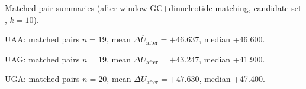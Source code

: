 Matched-pair summaries (after-window GC+dinucleotide matching, candidate set , $k=10$).

UAA: matched pairs $n=19$, mean $\Delta\overline{U}_{\mathrm{after}}=+46.637$, median +46.600.

UAG: matched pairs $n=19$, mean $\Delta\overline{U}_{\mathrm{after}}=+43.247$, median +41.900.

UGA: matched pairs $n=20$, mean $\Delta\overline{U}_{\mathrm{after}}=+47.630$, median +47.400.
